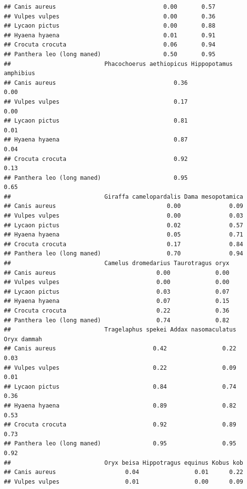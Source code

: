 \documentclass[
]{article}
\begin{document}
\begin{verbatim}
## Canis aureus                               0.00       0.57
## Vulpes vulpes                              0.00       0.36
## Lycaon pictus                              0.00       0.88
## Hyaena hyaena                              0.01       0.91
## Crocuta crocuta                            0.06       0.94
## Panthera leo (long maned)                  0.50       0.95
##                           Phacochoerus aethiopicus Hippopotamus amphibius
## Canis aureus                                  0.36                   0.00
## Vulpes vulpes                                 0.17                   0.00
## Lycaon pictus                                 0.81                   0.01
## Hyaena hyaena                                 0.87                   0.04
## Crocuta crocuta                               0.92                   0.13
## Panthera leo (long maned)                     0.95                   0.65
##                           Giraffa camelopardalis Dama mesopotamica
## Canis aureus                                0.00              0.09
## Vulpes vulpes                               0.00              0.03
## Lycaon pictus                               0.02              0.57
## Hyaena hyaena                               0.05              0.71
## Crocuta crocuta                             0.17              0.84
## Panthera leo (long maned)                   0.70              0.94
##                           Camelus dromedarius Taurotragus oryx
## Canis aureus                             0.00             0.00
## Vulpes vulpes                            0.00             0.00
## Lycaon pictus                            0.03             0.07
## Hyaena hyaena                            0.07             0.15
## Crocuta crocuta                          0.22             0.36
## Panthera leo (long maned)                0.74             0.82
##                           Tragelaphus spekei Addax nasomaculatus Oryx dammah
## Canis aureus                            0.42                0.22        0.03
## Vulpes vulpes                           0.22                0.09        0.01
## Lycaon pictus                           0.84                0.74        0.36
## Hyaena hyaena                           0.89                0.82        0.53
## Crocuta crocuta                         0.92                0.89        0.73
## Panthera leo (long maned)               0.95                0.95        0.92
##                           Oryx beisa Hippotragus equinus Kobus kob
## Canis aureus                    0.04                0.01      0.22
## Vulpes vulpes                   0.01                0.00      0.09

\end{verbatim}
\end{document}
